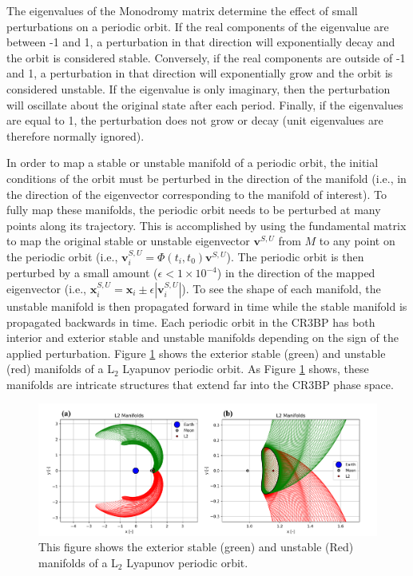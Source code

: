 \documentclass[11pt]{article} %
\begin{document}
\noindent
The eigenvalues of the Monodromy matrix determine the effect of small perturbations on a periodic orbit. If the real components of the eigenvalue are between -1 and 1, a perturbation in that direction will exponentially decay and the orbit is considered stable. Conversely, if the real components are outside of -1 and 1, a perturbation in that direction will exponentially grow and the orbit is considered unstable. If the eigenvalue is only imaginary, then the perturbation will oscillate about the original state after each period. Finally, if the eigenvalues are equal to 1, the perturbation does not grow or decay (unit eigenvalues are therefore normally ignored).

In order to map a stable or unstable manifold of a periodic orbit, the initial conditions of the orbit must be perturbed in the direction of the manifold (i.e., in the direction of the eigenvector corresponding to the manifold of interest). To fully map these manifolds, the periodic orbit needs to be perturbed at many points along its trajectory. This is accomplished by using the fundamental matrix to map the original stable or unstable eigenvector $\bm{v}^{S,U}$ from $M$ to any point on the periodic orbit (i.e., $\bm{v}_i^{S,U}=\Phi\left(t_i,t_0\right)\bm{v}^{S,U}$). The periodic orbit is then perturbed by a small amount ($\epsilon < 1\times10^{-4}$) in the direction of the mapped eigenvector (i.e., $\bm{x}_{i}^{S,U}=\bm{x}_{i}\pm\epsilon|\bm{v}_i^{S,U}|$). To see the shape of each manifold, the unstable manifold is then propagated forward in time while the stable manifold is propagated backwards in time. Each periodic orbit in the CR3BP has both interior and exterior stable and unstable manifolds depending on the sign of the applied perturbation. Figure \ref{f:manifolds} shows the exterior stable (green) and unstable (red) manifolds of a L$_2$ Lyapunov periodic orbit. As Figure \ref{f:manifolds} shows, these manifolds are intricate structures that extend far into the CR3BP phase space. 

\begin{figure}[H]
    \centering
    \includegraphics[width=\textwidth]{manifold_comb.png}
    \caption{This figure shows the exterior stable (green) and unstable (Red) manifolds of a L$_2$ Lyapunov periodic orbit.}
    \label{f:manifolds}
\end{figure}
\end{document}
